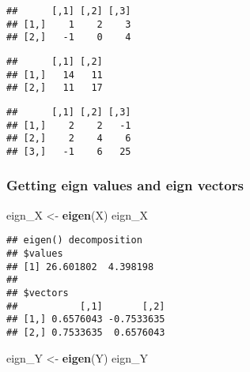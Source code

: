 \documentclass[]{article}
\newenvironment{Shaded}{\begin{snugshade}}{\end{snugshade}}
\newcommand{\CommentTok}[1]{\textcolor[rgb]{0.56,0.35,0.01}{\textit{#1}}}
\newcommand{\KeywordTok}[1]{\textcolor[rgb]{0.13,0.29,0.53}{\textbf{#1}}}
\newcommand{\NormalTok}[1]{#1}
\newcommand{\OperatorTok}[1]{\textcolor[rgb]{0.81,0.36,0.00}{\textbf{#1}}}
\newcommand{\StringTok}[1]{\textcolor[rgb]{0.31,0.60,0.02}{#1}}
\begin{document}
\begin{verbatim}
##      [,1] [,2] [,3]
## [1,]    1    2    3
## [2,]   -1    0    4
\end{verbatim}

\begin{Shaded}
\end{Shaded}

\begin{verbatim}
##      [,1] [,2]
## [1,]   14   11
## [2,]   11   17
\end{verbatim}

\begin{Shaded}
\end{Shaded}

\begin{verbatim}
##      [,1] [,2] [,3]
## [1,]    2    2   -1
## [2,]    2    4    6
## [3,]   -1    6   25
\end{verbatim}

\hypertarget{getting-eign-values-and-eign-vectors}{%
\subsubsection{Getting eign values and eign
vectors}\label{getting-eign-values-and-eign-vectors}}

\begin{Shaded}
\begin{Highlighting}[]
\NormalTok{eign_X <-}\StringTok{ }\KeywordTok{eigen}\NormalTok{(X)}
\NormalTok{eign_X}
\end{Highlighting}
\end{Shaded}

\begin{verbatim}
## eigen() decomposition
## $values
## [1] 26.601802  4.398198
## 
## $vectors
##           [,1]       [,2]
## [1,] 0.6576043 -0.7533635
## [2,] 0.7533635  0.6576043
\end{verbatim}

\begin{Shaded}
\begin{Highlighting}[]
\NormalTok{eign_Y <-}\StringTok{ }\KeywordTok{eigen}\NormalTok{(Y)}
\NormalTok{eign_Y}
\end{Highlighting}
\end{Shaded}
\end{document}
